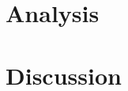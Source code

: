 \documentclass[apjl]{emulateapj}
\begin{document}




\section{Analysis}
\label{sec:analysis}

\section{Discussion}
\label{sec:discussion}



\end{document}
